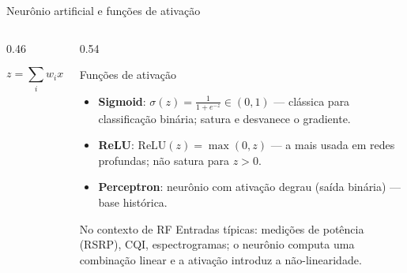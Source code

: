 \documentclass[aspectratio=169,11pt]{beamer}
\begin{document}
\begin{frame}{Neurônio artificial e funções de ativação}
  \begin{columns}
    \begin{column}{0.46\textwidth}
      \begin{center}
      \end{center}
      $$z=\textstyle\sum_{i} w_ix_i+b,\quad y=f(z).$$
    \end{column}
    \begin{column}{0.54\textwidth}
      \begin{block}{Funções de ativação}
        \begin{itemize}
          \item \textbf{Sigmoid}: $\sigma(z)=\frac{1}{1+e^{-z}}\in(0,1)$ --- clássica para classificação binária; satura e desvanece o gradiente.
          \item \textbf{ReLU}: $\mathrm{ReLU}(z)=\max(0,z)$ --- a mais usada em redes profundas; não satura para $z>0$.
          \item \textbf{Perceptron}: neurônio com ativação degrau (saída binária) --- base histórica.
        \end{itemize}
      \end{block}
      \begin{alertblock}{No contexto de RF}
        Entradas típicas: medições de potência (RSRP), CQI, espectrogramas; o neurônio computa uma combinação linear e a ativação introduz a não-linearidade.
      \end{alertblock}
    \end{column}
  \end{columns}
\end{frame}
\end{document}
